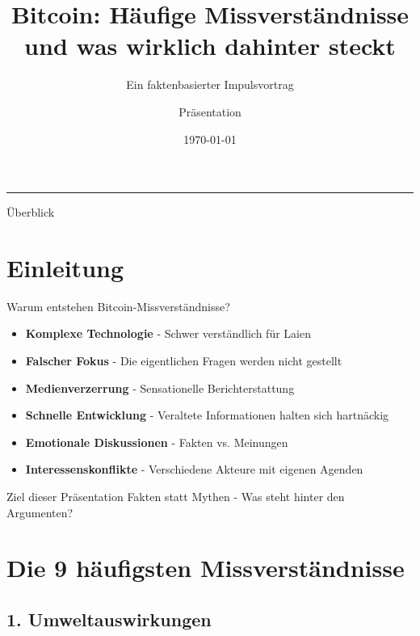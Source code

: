 \documentclass[aspectratio=169,t,9pt]{beamer}
\title[Bitcoin Missverständnisse]{Bitcoin: Häufige Missverständnisse und was wirklich dahinter steckt}
\subtitle{Ein faktenbasierter Impulsvortrag}
\author{Präsentation}
\date{\today}
\institute{Bitcoin Entdecken / Bitcoin Austria}
\begin{document}
\begin{frame}
    \titlepage
    \begin{center}
        \textcolor{bitcoinorange}{\rule{0.8\textwidth}{2pt}}
    \end{center}
\end{frame}

\begin{frame}{Überblick}
    \tableofcontents
\end{frame}

\section{Einleitung}

\begin{frame}{Warum entstehen Bitcoin-Missverständnisse?}
    \begin{itemize}
        \item \textbf{Komplexe Technologie} - Schwer verständlich für Laien
	\item \textbf{Falscher Fokus} - Die eigentlichen Fragen werden nicht gestellt
        \item \textbf{Medienverzerrung} - Sensationelle Berichterstattung
        \item \textbf{Schnelle Entwicklung} - Veraltete Informationen halten sich hartnäckig
        \item \textbf{Emotionale Diskussionen} - Fakten vs. Meinungen
        \item \textbf{Interessenskonflikte} - Verschiedene Akteure mit eigenen Agenden
    \end{itemize}
    \vspace{2em}
    \begin{alertblock}{Ziel dieser Präsentation}
        Fakten statt Mythen - Was steht hinter den Argumenten?
    \end{alertblock}
\end{frame}

\section{Die 9 häufigsten Missverständnisse}

\subsection{1. Umweltauswirkungen}
\end{document}
